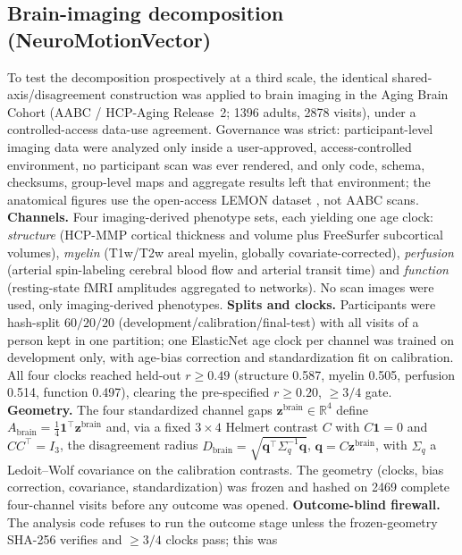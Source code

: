 \documentclass[11pt]{article}
\newcommand{\D}{\ensuremath{D}}
\newcommand{\A}{\ensuremath{A}}
\begin{document}
\subsection{Brain-imaging decomposition (NeuroMotionVector)}
\label{sec:neuromethods}
To test the decomposition prospectively at a third scale, the identical
shared-axis/disagreement construction was applied to brain imaging in the Aging Brain Cohort
(AABC / HCP-Aging Release~2; \num{1396} adults, \num{2878} visits),
under a controlled-access data-use agreement. Governance was strict: participant-level
imaging data were analyzed only inside a user-approved, access-controlled environment,
no participant scan was ever rendered, and only code, schema, checksums, group-level
maps and aggregate results left that environment; the anatomical figures use the
open-access LEMON dataset \citep{babayan2019}, not AABC scans. \textbf{Channels.} Four
imaging-derived phenotype sets, each yielding one age clock: \emph{structure} (HCP-MMP
cortical thickness and volume plus FreeSurfer subcortical volumes), \emph{myelin}
(T1w/T2w areal myelin, globally covariate-corrected), \emph{perfusion} (arterial
spin-labeling cerebral blood flow and arterial transit time) and \emph{function}
(resting-state fMRI amplitudes aggregated to networks). No scan images were used, only
imaging-derived phenotypes. \textbf{Splits and clocks.} Participants were hash-split
$60/20/20$ (development/calibration/final-test) with all visits of a person kept in one
partition; one ElasticNet age clock per channel was trained on development only, with
age-bias correction and standardization fit on calibration. All four clocks reached
held-out $r\ge\num{0.49}$ (structure \num{0.587}, myelin \num{0.505}, perfusion
\num{0.514}, function \num{0.497}), clearing the pre-specified $r\ge\num{0.20}$,
$\ge3/4$ gate. \textbf{Geometry.} The four standardized channel gaps
$\mathbf{z}^{\text{brain}}\in\mathbb{R}^4$ define $\A_{\text{brain}}=\tfrac14\mathbf{1}^\top\mathbf{z}^{\text{brain}}$
and, via a fixed $3\times4$ Helmert contrast $C$ with $C\mathbf{1}=0$ and $CC^\top=I_3$,
the disagreement radius
$\D_{\text{brain}}=\sqrt{\mathbf{q}^\top\Sigma_q^{-1}\mathbf{q}}$,
$\mathbf{q}=C\mathbf{z}^{\text{brain}}$, with $\Sigma_q$ a Ledoit--Wolf covariance on the
calibration contrasts. The geometry (clocks, bias correction, covariance, standardization)
was frozen and hashed on \num{2469} complete four-channel visits before any outcome was
opened. \textbf{Outcome-blind firewall.} The analysis code refuses to run the outcome
stage unless the frozen-geometry SHA-256 verifies and $\ge3/4$ clocks pass; this was
\end{document}
